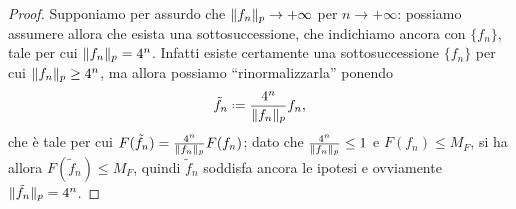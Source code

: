 \begin{proof}
    Supponiamo per assurdo che $\lVert f_n\rVert_p\to+\infty$ per $n\to+\infty$: possiamo assumere allora che esista una sottosuccessione, che indichiamo ancora con $\{f_n\}$, tale per cui $\lVert f_n\rVert_p=4^n$.
    Infatti esiste certamente una sottosuccessione $\{f_n\}$ per cui $\lVert f_n\rVert_p\ge 4^n$, ma allora possiamo ``rinormalizzarla'' ponendo
    \begin{equation}
        \tilde{f}_n\defeq\frac{4^n}{\norm{f_n}_p}f_n,
    \end{equation}
    che è tale per cui $F(\tilde{f}_n)=\frac{4^n}{\lVert f_n\rVert_p}F(f_n)$; dato che $\frac{4^n}{\lVert f_n\rVert_p}\le 1$ e $F(f_n)\le M_F$, si ha allora $F(\tilde{f}_n)\le M_F$, quindi $\tilde{f}_n$ soddisfa ancora le ipotesi e ovviamente $\lVert\tilde{f}_n\rVert_p=4^n$.


\end{proof}
